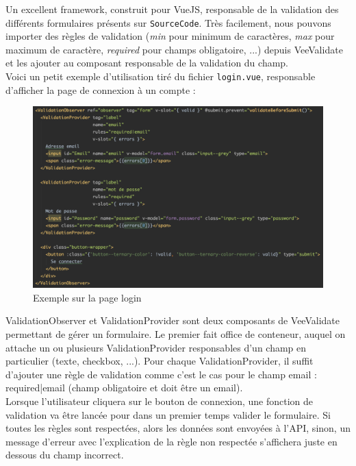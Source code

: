 Un excellent framework, construit pour VueJS, responsable de la validation des différents formulaires présents sur \texttt{SourceCode}. Très facilement, nous pouvons importer des règles de validation (\textit{min} pour minimum de caractères, \textit{max} pour maximum de caractère, \textit{required} pour champs obligatoire, ...) depuis VeeValidate et les ajouter au composant responsable de la validation du champ.\\

Voici un petit exemple d'utilisation tiré du fichier \texttt{login.vue}, responsable d'afficher la page de connexion à un compte :\\

\begin{figure}[H]
    \includegraphics[width=\textwidth,height=0.35\textheight,keepaspectratio]{images/libraries/veevalidate.png}
    \centering
    \caption[VeeValidate : Exemple d'utilisation]{Exemple sur la page login}
\end{figure}

ValidationObserver et ValidationProvider sont deux composants de VeeValidate permettant de gérer un formulaire. Le premier fait office de conteneur, auquel on attache un ou plusieurs ValidationProvider responsables d'un champ en particulier (texte, checkbox, ...). Pour chaque ValidationProvider, il suffit d'ajouter une règle de validation comme c'est le cas pour le champ email : required|email (champ obligatoire et doit être un email).\\

Lorsque l'utilisateur cliquera sur le bouton de connexion, une fonction de validation va être lancée pour dans un premier temps valider le formulaire. Si toutes les règles sont respectées, alors les données sont envoyées à l'API, sinon, un message d'erreur avec l'explication de la règle non respectée s'affichera juste en dessous du champ incorrect.\\

